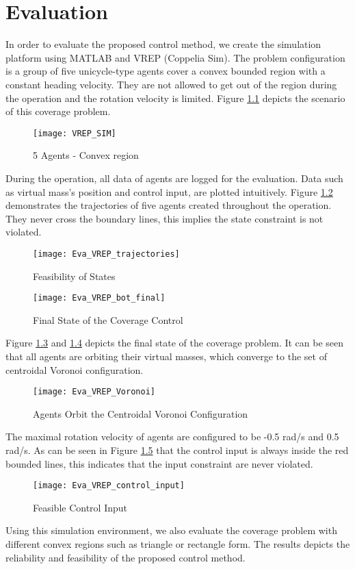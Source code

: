 \chapter{Evaluation}

In order to evaluate the proposed control method, we create the simulation platform using MATLAB and VREP (Coppelia Sim). The problem configuration is a group of five unicycle-type agents cover a convex bounded region with a constant heading velocity. They are not allowed to get out of the region during the operation and the rotation velocity is limited. Figure \ref{fig:VREP} depicts the scenario of this coverage problem. 
\begin{figure} [h]
	\centering
	\texttt{[image: VREP\_SIM]}
	\caption{5 Agents - Convex region}
	\label{fig:VREP}
\end{figure}

During the operation, all data of agents are logged for the evaluation. Data such as virtual mass's position and control input, are plotted intuitively. Figure \ref{fig:VREP_state} demonstrates the trajectories of five agents created throughout the operation. They never cross the boundary lines, this implies the state constraint is not violated. \\
\begin{figure} [!h]
	\centering
	\texttt{[image: Eva\_VREP\_trajectories]}
	\caption{Feasibility of States}
	\label{fig:VREP_state}
\end{figure}

\begin{figure} [!h]
	\centering
	\texttt{[image: Eva\_VREP\_bot\_final]}
	\caption{Final State of the Coverage Control}
	\label{fig:VREP_bot_final}
\end{figure}
Figure \ref{fig:VREP_bot_final} and \ref{fig:VREP_voronoi} depicts the final state of the coverage problem. It can be seen that all agents are orbiting their virtual masses, which converge to the set of centroidal Voronoi configuration. \\
\begin{figure} [!h]
	\centering
	\texttt{[image: Eva\_VREP\_Voronoi]}
	\caption{Agents Orbit the Centroidal Voronoi Configuration}
	\label{fig:VREP_voronoi}
\end{figure}

The maximal rotation velocity of agents are configured to be -0.5 rad/s and 0.5 rad/s. As can be seen in Figure \ref{fig:VREP_control_input} that the control input is always inside the red bounded lines, this indicates that the input constraint are never violated. \\
\begin{figure} [!h]
	\centering
	\texttt{[image: Eva\_VREP\_control\_input]}
	\caption{Feasible Control Input}
	\label{fig:VREP_control_input}
\end{figure}

Using this simulation environment, we also evaluate the coverage problem with different convex regions such as triangle or rectangle form. The results depicts the reliability and feasibility of the proposed control method.